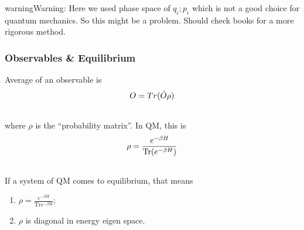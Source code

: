 \documentclass[letterpaper,10pt,english]{sphinxmanual}
\begin{document}
\begin{notice}{warning}{Warning:}
Here we used phase space of ${q_i;p_i}$ which is not a good choice for quantum mechanics. So this might be a problem. Should check books for a more rigorous method.
\end{notice}


\subsubsection{Observables \& Equilibrium}
\label{equilibrium/week3:observables-equilibrium}
Average of an observable is
\begin{gather}
\begin{split}O = Tr(\hat O \rho)\end{split}\notag\\\begin{split}\end{split}\notag
\end{gather}
where $\rho$ is the ``probability matrix''. In QM, this is
\begin{gather}
\begin{split}\rho = \frac{ e^{-\beta H} }{\mathrm{Tr} ( e^{-\beta H} ) }\end{split}\notag\\\begin{split}\end{split}\notag
\end{gather}
If a system of QM comes to equilibrium, that means
\begin{enumerate}
\item {} 
$\rho  = \frac{ e^{-\beta H} }{\mathrm{Tr} e^{-\beta H} }$;

\item {} 
$\rho$ is diagonal in energy eigen space.

\end{enumerate}
\end{document}
